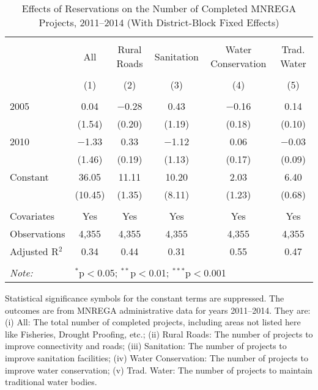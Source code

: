 \begin{table}[!htbp]
\centering
\begin{threeparttable}

  \caption{Effects of Reservations on the Number of Completed MNREGA Projects, 2011--2014 (With District-Block Fixed Effects)} 
  \label{main_mnrega_fe} 
\scriptsize 
\begin{tabular}{@{\extracolsep{0pt}}lccccc} 
\\[-1.8ex]\hline 
\hline \\[-1.8ex] 
 & All & Rural Roads & Sanitation & Water Conservation & Trad. Water \\ 
\\[-1.8ex] & (1) & (2) & (3) & (4) & (5)\\ 
\hline \\[-1.8ex] 
 2005 & 0.04 & $-$0.28 & 0.43 & $-$0.16 & 0.14 \\ 
  & (1.54) & (0.20) & (1.19) & (0.18) & (0.10) \\ 
  2010 & $-$1.33 & 0.33 & $-$1.12 & 0.06 & $-$0.03 \\ 
  & (1.46) & (0.19) & (1.13) & (0.17) & (0.09) \\ 
  Constant & 36.05 & 11.11 & 10.20 & 2.03 & 6.40 \\ 
  & (10.45) & (1.35) & (8.11) & (1.23) & (0.68) \\ 
 \hline \\[-1.8ex] 
Covariates & Yes & Yes & Yes & Yes & Yes \\ 
Observations & 4,355 & 4,355 & 4,355 & 4,355 & 4,355 \\ 
Adjusted R$^{2}$ & 0.34 & 0.44 & 0.31 & 0.55 & 0.47 \\ 
\hline 
\hline \\[-1.8ex] 
\textit{Note:}  & \multicolumn{5}{l}{$^{*}$p$<$0.05; $^{**}$p$<$0.01; $^{***}$p$<$0.001} \\ 
\end{tabular} 
\begin{tablenotes}[flushleft]
\scriptsize
\item[] Statistical significance symbols for the constant terms are suppressed. The outcomes are from MNREGA administrative data for years 2011--2014. They are: 
(i) All: The total number of completed projects, including areas not listed here like Fisheries, Drought Proofing, etc.;
(ii) Rural Roads: The number of projects to improve connectivity and roads;
(iii) Sanitation: The number of projects to improve sanitation facilities;
(iv) Water Conservation: The number of projects to improve water conservation;
(v) Trad. Water: The number of projects to maintain traditional water bodies.
\end{tablenotes}
\end{threeparttable}
\end{table}
